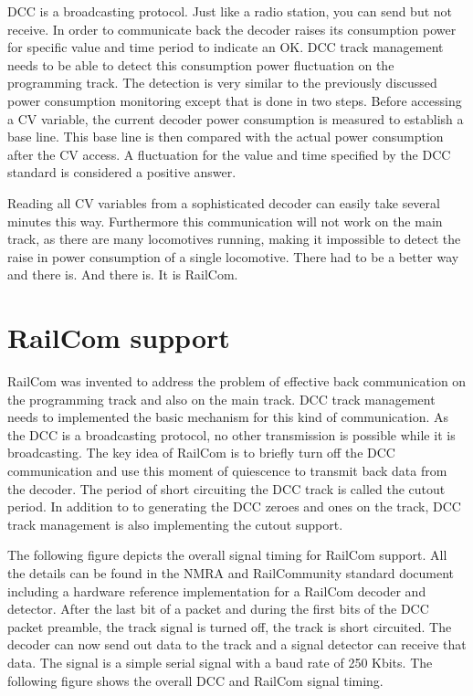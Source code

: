 DCC is a broadcasting protocol. Just like a radio station, you can send but not receive. In order to communicate back the decoder raises its consumption power for specific value and time period to indicate an OK. DCC track management needs to be able to detect this consumption power fluctuation on the programming track. The detection is very similar to the previously discussed power consumption monitoring except that is done in two steps. Before accessing a CV variable, the current decoder power consumption is measured to establish a base line. This base line is then compared with the actual power consumption after the CV access. A fluctuation for the value and time specified by the DCC standard is considered a positive answer.

Reading all CV variables from a sophisticated decoder can easily take several minutes this way. Furthermore this communication will not work on the main track, as there are many locomotives running, making it impossible to detect the raise in power consumption of a single locomotive. There had to be a better way and there is. And there is. It is RailCom.

\section{RailCom support}

RailCom was invented to address the problem of effective back communication on the programming track and also on the main track. DCC track management needs to implemented the basic mechanism for this kind of communication. As the DCC is a broadcasting protocol, no other transmission is possible while it is broadcasting. The key idea of RailCom is to briefly turn off the DCC communication and use this moment of quiescence to transmit back data from the decoder. The period of short circuiting the DCC track is called the cutout period. In addition to to generating the DCC zeroes and ones on the track, DCC track management is also implementing the cutout support.

The following figure depicts the overall signal timing for RailCom support. All the details can be found in the NMRA and RailCommunity standard document including a hardware reference implementation for a RailCom decoder and detector. After the last bit of a packet and during the first bits of the DCC packet preamble, the track signal is turned off, the track is short circuited. The decoder can now send out data to the track and a signal detector can receive that data. The signal is a simple serial signal with a baud rate of 250 Kbits. The following figure shows the overall DCC and RailCom signal timing.

